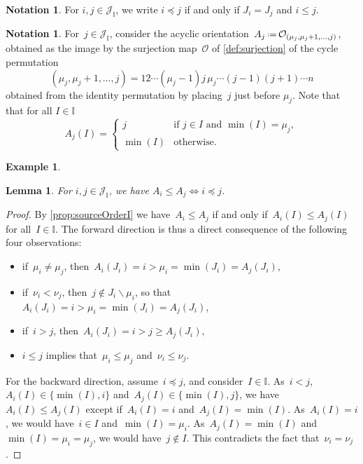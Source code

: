 \documentclass[reqno]{amsart}
\newtheorem{lemma}[theorem]{Lemma}
\theoremstyle{definition}
\newtheorem{example}[theorem]{Example}
\newtheorem{notation}[theorem]{Notation}
\newcommand{\cal}[1]{\mathcal{#1}} %
\newcommand{\ssm}{\smallsetminus} %
\newcommand{\eqdef}{\mbox{\,\raisebox{0.2ex}{\scriptsize\ensuremath{\mathrm:}}\ensuremath{=}\,}} %
\newcommand{\vincent}[1]{\todo[size=\tiny,color=blue!30]{ #1 \\ \hfill --- V.}\,}
\newcommand{\Or}{\mathcal O}  %
\newcommand{\II}{\mathbb I} %
\newcommand{\cJ}{\cal{J}} %
\begin{document}
\begin{notation}
For $i,j \in \cJ_\II$, we write $i \preccurlyeq j$ if and only if $J_i = J_j$ and $i \le j$.
\end{notation}

\begin{notation}
For~$j \in \cJ_\II$, consider the acyclic orientation~$A_j \eqdef \Or_{(\mu_j, \mu_j+1, \ldots, j)}$, obtained as the image by the surjection map~$\Or$ of \cref{def:surjection} of the cycle permutation
\[
(\mu_j, \mu_j+1, \dots, j) = 12 \cdots (\mu_j-1)j\,\mu_j \cdots (j-1) (j+1) \cdots n
\]
obtained from the identity permutation by placing~$j$ just before $\mu_j$.
Note that that for all $I\in\II$
\begin{equation}
\label{eq:sourceOj}
A_j(I)=\begin{cases}
	j & \text{if } j \in I \text{ and } \min(I)=\mu_j,\\
	\min(I) & \text{otherwise.}
\end{cases}
\end{equation}
\end{notation}

\begin{example}
\vincent{todo}
\end{example}

\begin{lemma}
\label{lem:irrorder}
For $i,j \in \cJ_\II$, we have $A_i \le A_j \iff i \preccurlyeq j$.
\end{lemma}

\begin{proof}
By \cref{prop:sourceOrderI} we have~$A_i \le A_j$ if and only if~$A_i(I) \le A_j(I)$ for all~$I \in \II$.
%
The forward direction is thus a direct consequence of the following four observations:
\begin{itemize}
\item if~$\mu_i \ne \mu_j$, then~$A_i(J_i) = i > \mu_i = \min(J_i) = A_j(J_i)$,
\item if~$\nu_i < \nu_j$, then~$j \notin J_i \ssm \mu_i$, so that~$A_i(J_i) = i > \mu_i = \min(J_i) = A_j(J_i)$,
\item if~$i > j$, then~$A_i(J_i) = i > j \ge A_j(J_i)$,
\item $i \le j$ implies that~$\mu_i \le \mu_j$ and~$\nu_i \le \nu_j$.
\end{itemize}
%
For the backward direction, assume~$i \preccurlyeq j $, and consider~$I \in \II$.
As~$i < j$, $A_i(I) \in \{\min(I), i\}$ and~$A_j(I) \in \{\min(I), j\}$, we have~$A_i(I) \le A_j(I)$ except if~$A_i(I) = i$ and~$A_j(I) = \min(I)$.
As~$A_i(I) = i$, we would have~$i \in I$ and~$\min(I) = \mu_i$. As~$A_j(I) = \min(I)$ and~$\min(I) = \mu_i = \mu_j$, we would have~$j \notin I$.
This contradicts the fact that~$\nu_i = \nu_j$.
\end{proof}
\end{document}

